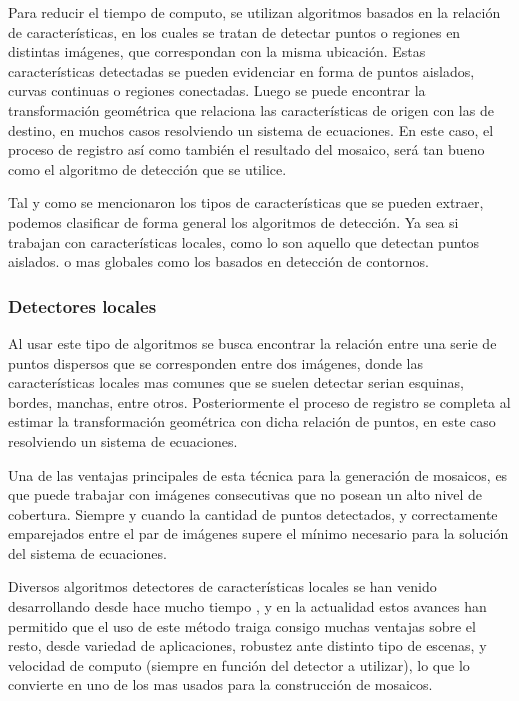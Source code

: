 
Para reducir el tiempo de computo, se utilizan algoritmos basados en la relación de características, en los cuales se tratan de detectar puntos o regiones en distintas imágenes, que correspondan con la misma ubicación. Estas características detectadas se pueden evidenciar en forma de puntos aislados, curvas continuas o regiones conectadas. Luego se puede encontrar la transformación geométrica que relaciona las características de origen con las de destino, en muchos casos resolviendo un sistema de ecuaciones. En este caso, el proceso de registro así como también el resultado del mosaico, será tan bueno como el algoritmo de detección que se utilice.

Tal y como se mencionaron los tipos de características que se pueden extraer, podemos clasificar de forma general los algoritmos de detección. Ya sea si trabajan con características locales, como lo son aquello que detectan puntos aislados. o mas globales como los basados en detección de contornos.

\subsubsection*{Detectores locales}

Al usar este tipo de algoritmos se busca encontrar la relación entre una serie de puntos dispersos que se corresponden entre dos imágenes, donde las características locales mas comunes que se suelen detectar serian esquinas, bordes, manchas, entre otros. Posteriormente el proceso de registro se completa al estimar la transformación geométrica con dicha relación de puntos, en este caso resolviendo un sistema de ecuaciones.

Una de las ventajas principales de esta técnica para la generación de mosaicos, es que puede trabajar con imágenes consecutivas que no posean un alto nivel de cobertura. Siempre y cuando la cantidad de puntos detectados, y correctamente emparejados entre el par de imágenes supere el mínimo necesario para la solución del sistema de ecuaciones.

Diversos algoritmos detectores de características locales se han venido desarrollando desde hace mucho tiempo \cite{harris,sift,surf,fast,brief,orb,kaze,akaze}, y en la actualidad estos avances han permitido que el uso de este método traiga consigo muchas ventajas sobre el resto, desde variedad de aplicaciones, robustez ante distinto tipo de escenas, y velocidad de computo (siempre en función del detector a utilizar), lo que lo convierte en uno de los mas usados para la construcción de mosaicos.

